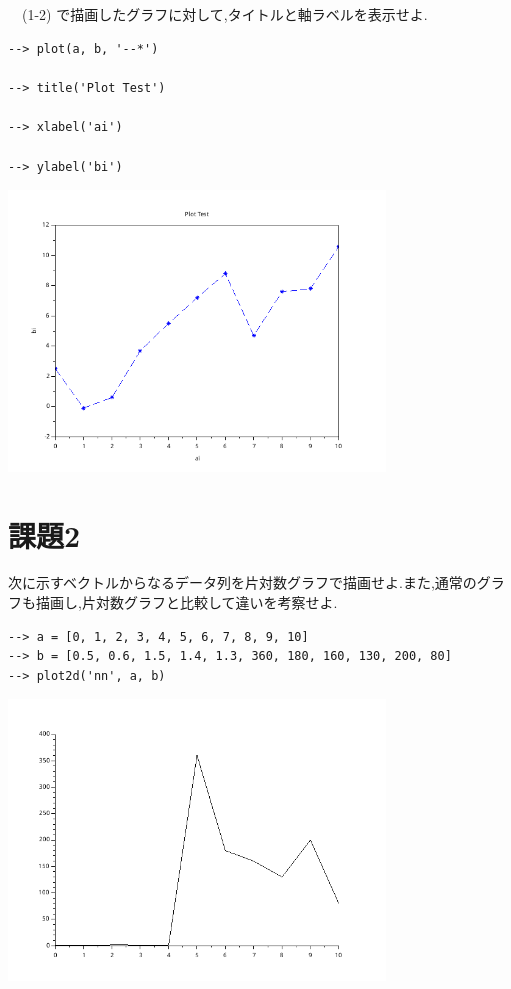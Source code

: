\documentclass[a4j, 11pt]{jarticle}
\begin{document}
\subsection{}
\label{sec:org4db939d}
　(1-2) で描画したグラフに対して,タイトルと軸ラベルを表示せよ.\\
\begin{verbatim}
--> plot(a, b, '--*')

--> title('Plot Test')

--> xlabel('ai')

--> ylabel('bi')
\end{verbatim}

\begin{center}
\includegraphics[width=10cm]{./1-3.png}
\end{center}
\section{課題2}
\label{sec:org6071a01}
次に示すベクトルからなるデータ列を片対数グラフで描画せよ.また,通常のグラフも描画し,片対数グラフと比較して違いを考察せよ.\\
\begin{verbatim}
--> a = [0, 1, 2, 3, 4, 5, 6, 7, 8, 9, 10]
--> b = [0.5, 0.6, 1.5, 1.4, 1.3, 360, 180, 160, 130, 200, 80]
--> plot2d('nn', a, b)
\end{verbatim}

\begin{center}
\includegraphics[width=10cm]{./2-no-kata.png}
\end{center}
\end{document}
